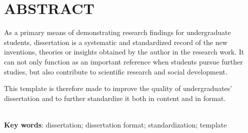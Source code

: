 

\section*{ABSTRACT}

\thesisbodyfont
As a primary means of demonstrating research findings for undergraduate students, dissertation is a systematic and standardized record of the new inventions, theories or insights obtained by the author in the research work. It can not only function as an important reference when students pursue further studies, but also contribute to scientific research and social development.\par
This template is therefore made to improve the quality of undergraduates' dissertation and to further standardize it both in content and in format.\par

~\\
\hspace*{2em}\textbf{Key words}: dissertation; dissertation format; standardization; template\\
